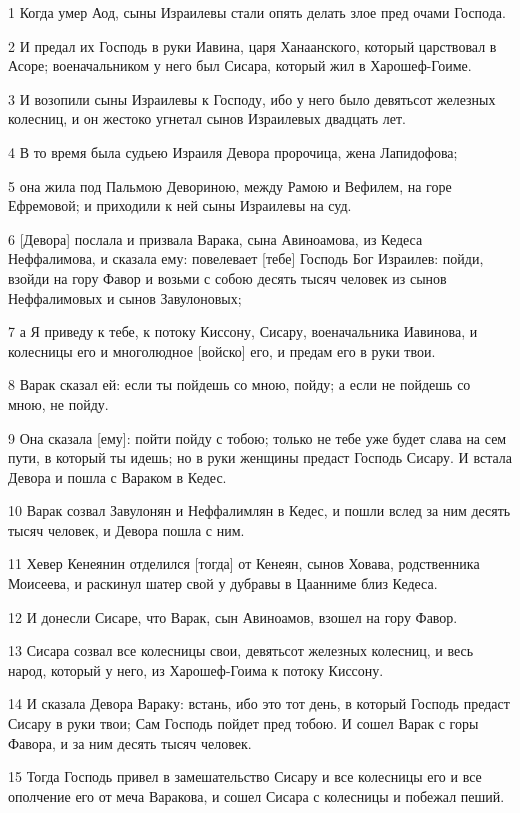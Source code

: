 \par 1 Когда умер Аод, сыны Израилевы стали опять делать злое пред очами Господа.
\par 2 И предал их Господь в руки Иавина, царя Ханаанского, который царствовал в Асоре; военачальником у него был Сисара, который жил в Харошеф-Гоиме.
\par 3 И возопили сыны Израилевы к Господу, ибо у него было девятьсот железных колесниц, и он жестоко угнетал сынов Израилевых двадцать лет.
\par 4 В то время была судьею Израиля Девора пророчица, жена Лапидофова;
\par 5 она жила под Пальмою Девориною, между Рамою и Вефилем, на горе Ефремовой; и приходили к ней сыны Израилевы на суд.
\par 6 [Девора] послала и призвала Варака, сына Авиноамова, из Кедеса Неффалимова, и сказала ему: повелевает [тебе] Господь Бог Израилев: пойди, взойди на гору Фавор и возьми с собою десять тысяч человек из сынов Неффалимовых и сынов Завулоновых;
\par 7 а Я приведу к тебе, к потоку Киссону, Сисару, военачальника Иавинова, и колесницы его и многолюдное [войско] его, и предам его в руки твои.
\par 8 Варак сказал ей: если ты пойдешь со мною, пойду; а если не пойдешь со мною, не пойду.
\par 9 Она сказала [ему]: пойти пойду с тобою; только не тебе уже будет слава на сем пути, в который ты идешь; но в руки женщины предаст Господь Сисару. И встала Девора и пошла с Вараком в Кедес.
\par 10 Варак созвал Завулонян и Неффалимлян в Кедес, и пошли вслед за ним десять тысяч человек, и Девора пошла с ним.
\par 11 Хевер Кенеянин отделился [тогда] от Кенеян, сынов Ховава, родственника Моисеева, и раскинул шатер свой у дубравы в Цаанниме близ Кедеса.
\par 12 И донесли Сисаре, что Варак, сын Авиноамов, взошел на гору Фавор.
\par 13 Сисара созвал все колесницы свои, девятьсот железных колесниц, и весь народ, который у него, из Харошеф-Гоима к потоку Киссону.
\par 14 И сказала Девора Вараку: встань, ибо это тот день, в который Господь предаст Сисару в руки твои; Сам Господь пойдет пред тобою. И сошел Варак с горы Фавора, и за ним десять тысяч человек.
\par 15 Тогда Господь привел в замешательство Сисару и все колесницы его и все ополчение его от меча Варакова, и сошел Сисара с колесницы и побежал пеший.
